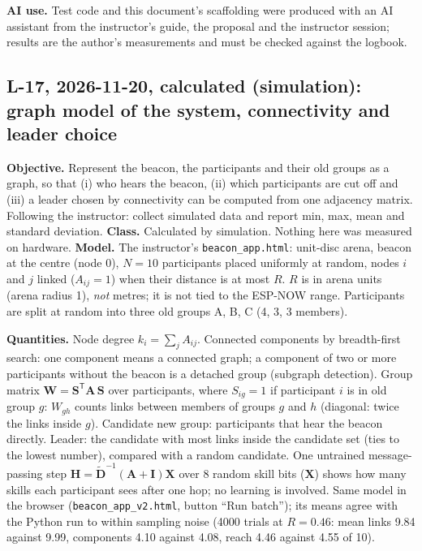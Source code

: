 \IfFileExists{IEEEtran.cls}{\documentclass[conference]{IEEEtran}}{\documentclass[10pt,twocolumn]{article}}
\begin{document}
\textbf{AI use.} Test code and this document's scaffolding were produced with an AI assistant from the instructor's guide, the proposal and the instructor session; results are the author's measurements and must be checked against the logbook.

\subsection*{L-17, 2026-11-20, calculated (simulation): graph model of the system, connectivity and leader choice}
\textbf{Objective.} Represent the beacon, the participants and their old groups as a graph, so that (i) who hears the beacon, (ii) which participants are cut off and (iii) a leader chosen by connectivity can be computed from one adjacency matrix. Following the instructor: collect simulated data and report min, max, mean and standard deviation. \textbf{Class.} Calculated by simulation. Nothing here was measured on hardware. \textbf{Model.} The instructor's \texttt{beacon\_app.html}: unit-disc arena, beacon at the centre (node 0), $N=10$ participants placed uniformly at random, nodes $i$ and $j$ linked ($A_{ij}=1$) when their distance is at most $R$. $R$ is in arena units (arena radius 1), \emph{not} metres; it is not tied to the ESP-NOW range. Participants are split at random into three old groups A, B, C (4, 3, 3 members).

\textbf{Quantities.} Node degree $k_i=\sum_j A_{ij}$. Connected components by breadth-first search: one component means a connected graph; a component of two or more participants without the beacon is a detached group (subgraph detection). Group matrix $\mathbf W=\mathbf S^{\mathsf T}\mathbf A\,\mathbf S$ over participants, where $S_{ig}=1$ if participant $i$ is in old group $g$: $W_{gh}$ counts links between members of groups $g$ and $h$ (diagonal: twice the links inside $g$). Candidate new group: participants that hear the beacon directly. Leader: the candidate with most links inside the candidate set (ties to the lowest number), compared with a random candidate. One untrained message-passing step $\mathbf H=\tilde{\mathbf D}^{-1}(\mathbf A+\mathbf I)\mathbf X$ over 8 random skill bits ($\mathbf X$) shows how many skills each participant sees after one hop; no learning is involved. Same model in the browser (\texttt{beacon\_app\_v2.html}, button ``Run batch''); its means agree with the Python run to within sampling noise (4000 trials at $R=0.46$: mean links 9.84 against 9.99, components 4.10 against 4.08, reach 4.46 against 4.55 of 10).
\end{document}
